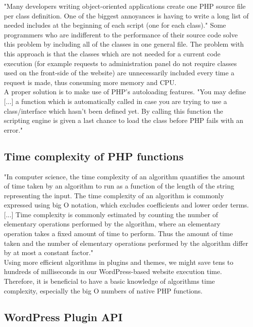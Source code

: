 "Many developers writing object-oriented applications create one PHP source file per class definition. One of the biggest annoyances is having to write a long list of needed includes at the beginning of each script (one for each class)." \cite{PHP:Autoloading} Some programmers who are indifferent to the performance of their source code solve this problem by including all of the classes in one general file. The problem with this approach is that the classes which are not needed for a current code execution (for example requests to administration panel do not require classes used on the front-side of the website) are unnecessarily included every time a request is made, thus consuming more memory and CPU. \\

A proper solution is to make use of PHP's autoloading features. "You may define [...] a function which is automatically called in case you are trying to use a class/interface which hasn't been defined yet. By calling this function the scripting engine is given a last chance to load the class before PHP fails with an error." \cite{PHP:Autoloading}

\subsection{Time complexity of PHP functions}

"In computer science, the time complexity of an algorithm quantifies the amount of time taken by an algorithm to run as a function of the length of the string representing the input. The time complexity of an algorithm is commonly expressed using big O notation, which excludes coefficients and lower order terms. [...] Time complexity is commonly estimated by counting the number of elementary operations performed by the algorithm, where an elementary operation takes a fixed amount of time to perform. Thus the amount of time taken and the number of elementary operations performed by the algorithm differ by at most a constant factor." \cite{Wiki:Time-complexity} \\

Using more efficient algorithms in plugins and themes, we might save tens to hundreds of milliseconds in our WordPress-based website execution time. Therefore, it is beneficial to have a basic knowledge of algorithms time complexity, especially the big O numbers of native PHP functions. \cite{SO:PHP-functions-big-O}

\subsection{WordPress Plugin API}

